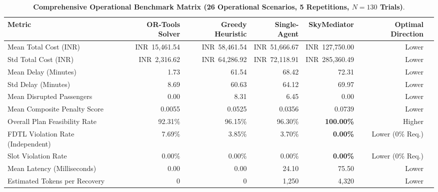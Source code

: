 \begin{table}[htbp]
\centering
\small
\caption{\textbf{Comprehensive Operational Benchmark Matrix (26 Operational Scenarios, 5 Repetitions, $N=130$ Trials)}.}
\label{tab:benchmark_matrix}
\begin{tabular}{@{}lrrrrrr@{}}
\toprule
\textbf{Metric} & \textbf{OR-Tools Solver} & \textbf{Greedy Heuristic} & \textbf{Single-Agent} & \textbf{SkyMediator} & \textbf{Optimal Direction} \\
\midrule
Mean Total Cost (INR) & INR~15,461.54 & INR~58,461.54 & INR~51,666.67 & INR~127,750.00 & Lower \\
Std Total Cost (INR) & INR~2,316.62 & INR~64,286.92 & INR~72,118.91 & INR~285,360.49 & Lower \\
Mean Delay (Minutes) & 1.73 & 61.54 & 68.42 & 72.31 & Lower \\
Std Delay (Minutes) & 8.69 & 60.63 & 64.12 & 69.97 & Lower \\
Mean Disrupted Passengers & 0.00 & 8.31 & 6.45 & 0.00 & Lower \\
Mean Composite Penalty Score & 0.0055 & 0.0525 & 0.0356 & 0.0739 & Lower \\
Overall Plan Feasibility Rate & 92.31\% & 96.15\% & 96.30\% & \textbf{100.00\%} & Higher \\
FDTL Violation Rate (Independent) & 7.69\% & 3.85\% & 3.70\% & \textbf{0.00\%} & Lower (0\% Req.) \\
Slot Violation Rate & 0.00\% & 0.00\% & 0.00\% & \textbf{0.00\%} & Lower (0\% Req.) \\
Mean Latency (Milliseconds) & 0.00 & 0.00 & 24.10 & 75.50 & Lower \\
Estimated Tokens per Recovery & 0 & 0 & 1,250 & 4,320 & Lower \\
\bottomrule
\end{tabular}
\end{table}

